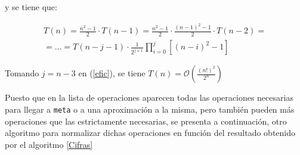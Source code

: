 \documentclass[a4paper,10pt]{scrartcl}
\def\C++#1{\texttt{#1}}
\begin{document}
\begin{itemize}
    y se tiene que:
    
    \begin{eqnarray} \label{efic}
    T(n)=\frac{n^2-1}{2}\cdot T(n-1)= \frac{n^2-1}{2}\cdot\frac{(n-1)^2-1}{2}
    \cdot T(n-2)=\\ \nonumber
    =\ldots=T(n-j-1)\cdot\frac{1}{2^{j+1}}\prod_{i=0}^j[(n-i)^2-1]
    \end{eqnarray}
    
    Tomando $j=n-3$ en (\ref{efic}), se tiene $T(n)=
    \mathcal{O}\left(\frac{(n!)^2}{2^n}\right)$
   \end{itemize}

   \newpage
   Puesto que en la lista de operaciones aparecen todas las operaciones necesarias
   para llegar a \C++{meta} o a una aproximación a la misma, pero también pueden
   más operaciones que las estrictamente necesarias, se presenta a continuación,
   otro algoritmo para normalizar dichas operaciones en función del resultado obtenido
   por el algoritmo \ref{Cifras} \\
   
\end{document}
